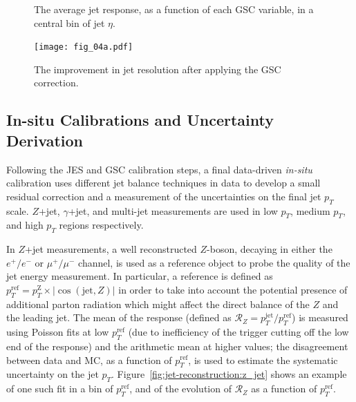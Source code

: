 \begin{figure}
\centering
{}

\label{fig:jet-reconstruction:gsc}
\caption{The average jet response, as a function of each GSC variable, in a central bin of jet $\eta$.}
\end{figure}

\begin{figure}
\centering
\texttt{[image: fig\_04a.pdf]}
\label{fig:jet-reconstruction:resolution_gsc}
\caption{The improvement in jet resolution after applying the GSC correction.}
\end{figure}


\subsection{In-situ Calibrations and Uncertainty Derivation}
\label{chapter:jet-reconstruction:insitu}

Following the JES and GSC calibration steps, a final data-driven \textit{in-situ} calibration uses different jet balance techniques in data to develop a small residual correction and a measurement of the uncertainties on the final jet $p_T$ scale. $Z$+jet, $\gamma$+jet, and multi-jet measurements are used in low $p_T$, medium $p_T$, and high $p_T$ regions respectively.

In $Z$+jet measurements, a well reconstructed $Z$-boson, decaying in either the $e^+/e^-$ or $\mu^+/\mu^-$ channel, is used as a reference object to probe the quality of the jet energy measurement. In particular, a reference \pt is defined as $p_T^\mathrm{ref} = p_T^\mathrm{Z} \times |\cos(\mathrm{jet}, Z) |$ in order to take into account the potential presence of additional parton radiation which might affect the direct balance of the $Z$ and the leading jet. The mean of the response (defined as $\mathcal{R}_Z = p_T^\mathrm{jet} / p_T^\mathrm{ref}$) is measured using Poisson fits at low $p_T^\mathrm{ref}$ (due to inefficiency of the trigger cutting off the low end of the response) and the arithmetic mean at higher values; the disagreement between data and MC, as a function of $p_T^\mathrm{ref}$, is used to estimate the systematic uncertainty on the jet $p_T$. Figure~\ref{fig:jet-reconstruction:z_jet} shows an example of one such fit in a bin of $p_T^\mathrm{ref}$, and of the evolution of $\mathcal{R}_Z$ as a function of $p_T^\mathrm{ref}$.

